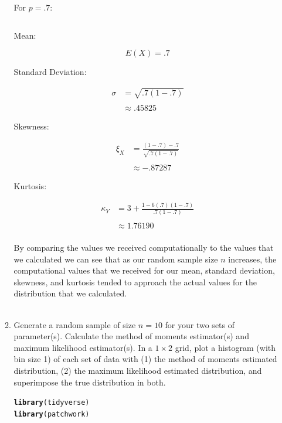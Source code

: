 \documentclass{article}\usepackage[]{graphicx}\usepackage[]{color}
\makeatletter
\newcommand{\hlstd}[1]{\textcolor[rgb]{0.345,0.345,0.345}{#1}}%
\newcommand{\hlkwd}[1]{\textcolor[rgb]{0.737,0.353,0.396}{\textbf{#1}}}%
\newenvironment{kframe}{%
 \def\at@end@of@kframe{}%
 \ifinner\ifhmode%
  \def\at@end@of@kframe{\end{minipage}}%
  \begin{minipage}{\columnwidth}%
 \fi\fi%
 \def\FrameCommand##1{\hskip\@totalleftmargin \hskip-\fboxsep
 \colorbox{shadecolor}{##1}\hskip-\fboxsep
     \hskip-\linewidth \hskip-\@totalleftmargin \hskip\columnwidth}%
 \MakeFramed {\advance\hsize-\width
   \@totalleftmargin\z@ \linewidth\hsize
   \@setminipage}}%
 {\par\unskip\endMakeFramed%
 \at@end@of@kframe}
\newenvironment{knitrout}{}{} %
\makeatother
\begin{document}
\begin{enumerate}
\begin{enumerate}
\[
\]

For $p=.7$:

\[
\]

Mean:

\[
E(X)=.7
\]

Standard Deviation:

\begin{align*}\sigma & =\sqrt{.7\left(1-.7\right)}\\
\\
 & \approx.45825
\end{align*}

Skewness:

\begin{align*}\xi_{X} & =\frac{\left(1-.7\right)-.7}{\sqrt{.7\left(1-.7\right)}}\\
\\
 & \approx-.87287
\end{align*}

Kurtosis:

\begin{align*}\kappa_{Y} & =3+\frac{1-6\left(.7\right)\left(1-.7\right)}{.7\left(1-.7\right)}\\
\\
 & \approx1.76190
\end{align*}\\
By comparing the values we received computationally to the values that we calculated we can see that as our random sample size $n$ increases, the computational values that we received for our mean, standard deviation, skewness, and kurtosis tended to approach the actual values for the distribution that we calculated.\\
\\
  \item Generate a random sample of size $n=10$ for your two sets of parameter(s).
  Calculate the method of moments estimator(s) and maximum likelihood estimator(s).
  In a $1 \times 2$ grid, plot a histogram (with bin size 1) of each set of data 
  with (1) the method of moments estimated distribution, (2) the maximum likelihood 
  estimated distribution, and superimpose the true distribution in both.
\begin{knitrout}
\color{fgcolor}\begin{kframe}
\begin{alltt}
\hlkwd{library}\hlstd{(tidyverse)}
\hlkwd{library}\hlstd{(patchwork)}


\end{alltt}
\end{kframe}
\end{knitrout}
\end{enumerate}
\end{enumerate}
\end{document}
